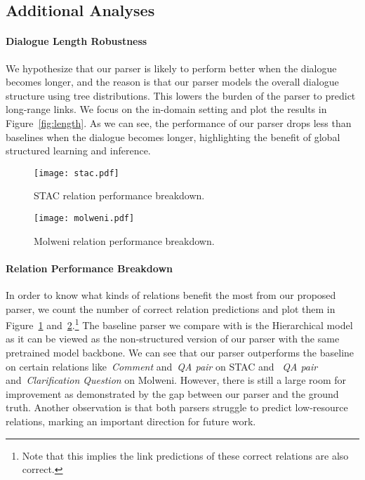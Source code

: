 \documentclass[11pt]{article}
\begin{document}
\subsection{Additional Analyses}
\paragraph{Dialogue Length Robustness}
We hypothesize that our parser is likely to perform better when the dialogue becomes longer, and the reason is that our parser models the overall dialogue structure using tree distributions. This lowers the burden of the parser to predict long-range links.
We focus on the in-domain setting and plot the results in Figure~\ref{fig:length}. As we can see, the performance of our parser drops less than baselines when the dialogue becomes longer, highlighting the benefit of global structured learning and inference.

\begin{figure}[]
\texttt{[image: stac.pdf]}
\caption{STAC relation performance breakdown.}
\label{fig:stac_breakdown}
\end{figure}

\begin{figure}[]
\texttt{[image: molweni.pdf]}
\caption{Molweni relation performance breakdown.}
\label{fig:molweni_breakdown}
\end{figure}

\paragraph{Relation Performance Breakdown}
In order to know what kinds of relations benefit the most from our proposed parser, we count the number of correct relation predictions and plot them in Figure~\ref{fig:stac_breakdown} and~\ref{fig:molweni_breakdown}.\footnote{Note that this implies the link predictions of these correct relations are also correct.} The baseline parser we compare with is the Hierarchical model~\cite{liu-chen-2021-improving} as it can be viewed as the non-structured version of our parser with the same pretrained model backbone. We can see that our parser outperforms the baseline on certain relations like~\emph{Comment} and~\emph{QA pair} on STAC and ~\emph{QA pair} and~\emph{Clarification Question} on Molweni.
However, there is still a large room for improvement as demonstrated by the gap between our parser and the ground truth. Another observation is that both parsers struggle to predict low-resource relations, marking an important direction for future work.
\end{document}
